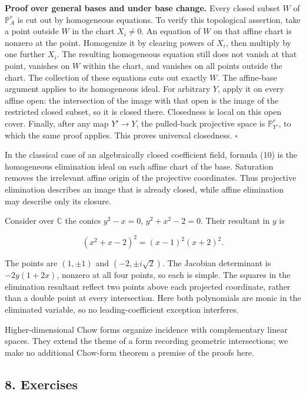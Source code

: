 \documentclass[
]{article}
\begin{document}
\textbf{Proof over general bases and under base change.} Every closed
subset \(W\) of \(\mathbb P^r_A\) is cut out by homogeneous equations.
To verify this topological assertion, take a point outside \(W\) in the
chart \(X_i\ne0\). An equation of \(W\) on that affine chart is nonzero
at the point. Homogenize it by clearing powers of \(X_i\), then multiply
by one further \(X_i\). The resulting homogeneous equation still does
not vanish at that point, vanishes on \(W\) within the chart, and
vanishes on all points outside the chart. The collection of these
equations cuts out exactly \(W\). The affine-base argument applies to
its homogeneous ideal. For arbitrary \(Y\), apply it on every affine
open: the intersection of the image with that open is the image of the
restricted closed subset, so it is closed there. Closedness is local on
this open cover. Finally, after any map \(Y'\to Y\), the pulled-back
projective space is \(\mathbb P^r_{Y'}\), to which the same proof
applies. This proves universal closedness. \(\square\)

In the classical case of an algebraically closed coefficient field,
formula (10) is the homogeneous elimination ideal on each affine chart
of the base. Saturation removes the irrelevant affine origin of the
projective coordinates. Thus projective elimination describes an image
that is already closed, while affine elimination may describe only its
closure.

Consider over \(\mathbb C\) the conics \(y^2-x=0\), \(y^2+x^2-2=0\).
Their resultant in \(y\) is

\[
(x^2+x-2)^2=(x-1)^2(x+2)^2.
\]

The points are \((1,\pm1)\) and \((-2,\pm i\sqrt2)\). The Jacobian
determinant is \(-2y(1+2x)\), nonzero at all four points, so each is
simple. The squares in the elimination resultant reflect two points
above each projected coordinate, rather than a double point at every
intersection. Here both polynomials are monic in the eliminated
variable, so no leading-coefficient exception interferes.

Higher-dimensional Chow forms organize incidence with complementary
linear spaces. They extend the theme of a form recording geometric
intersections; we make no additional Chow-form theorem a premise of the
proofs here.

\subsection{8. Exercises}\label{exercises}
\end{document}
